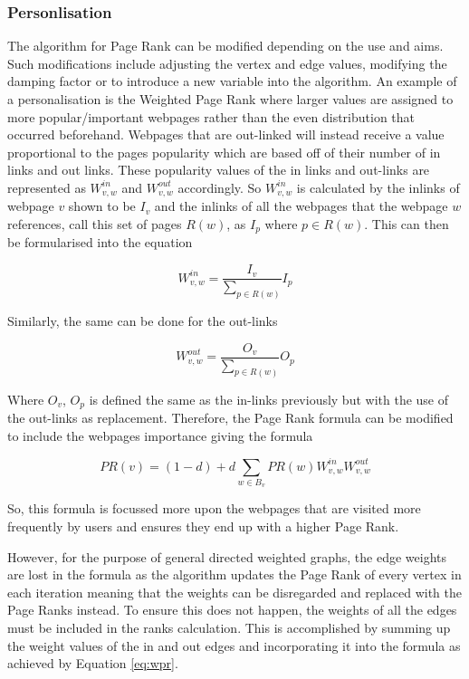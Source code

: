 \subsubsection{Personlisation}
The algorithm for Page Rank can be modified depending on the use and aims. Such modifications include adjusting the vertex and edge values, modifying the damping factor or to introduce a new variable into the algorithm. An example of a personalisation is the Weighted Page Rank \cite{xing2004weighted} where larger values are assigned to more popular/important webpages rather than the even distribution that occurred beforehand. Webpages that are out-linked will instead receive a value proportional to the pages popularity which are based off of their number of in links and out links. These popularity values of the in links and out-links are represented as $W^{in}_{v,w}$ and $W^{out}_{v,w}$ accordingly. So $W^{in}_{v,w}$ is calculated by the inlinks of webpage $v$ shown to be $I_v$ and the inlinks of all the webpages that the webpage $w$ references, call this set of pages $R(w)$, as $I_p$ where $p \in R(w)$. This can then be formularised into the equation

\begin{equation}
W^{in}_{v,w} = \frac{I_v}{\sum_{p \in R(w)}}{I_p}
\end{equation}

Similarly, the same can be done for the out-links 

\begin{equation}
W^{out}_{v,w} = \frac{O_v}{\sum_{p \in R(w)}}{O_p}
\end{equation}

Where $O_v$, $O_p$ is defined the same as the in-links previously but with the use of the out-links as replacement. Therefore, the Page Rank formula can be modified to include the webpages importance giving the formula

\begin{equation}
PR(v) = (1 - d) + d\sum_{w \in B_v}PR(w)W^{in}_{v,w}W^{out}_{v,w}
\end{equation}

So, this formula is focussed more upon the webpages that are visited more frequently by users and ensures they end up with a higher Page Rank. 

However, for the purpose of general directed weighted graphs, the edge weights are lost in the formula as the algorithm updates the Page Rank of every vertex in each iteration meaning that the weights can be disregarded and replaced with the Page Ranks instead. To ensure this does not happen, the weights of all the edges must be included in the ranks calculation. This is accomplished by summing up the weight values of the in and out edges and incorporating it into the formula as achieved by Equation \ref{eq:wpr}.

